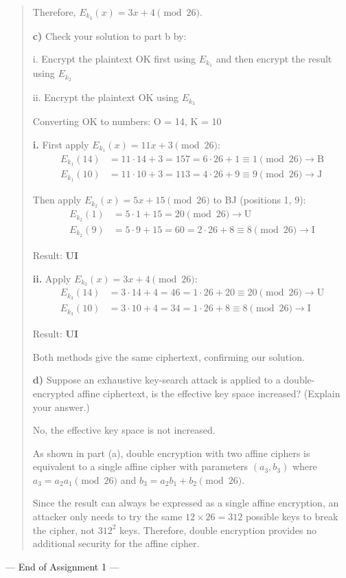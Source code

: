 \documentclass[12pt]{article}
\begin{document}
\begin{quote}
Therefore, $E_{k_3}(x) = 3x + 4 \pmod{26}$.

\vspace{0.5cm}

\textbf{c)} Check your solution to part b by:

i. Encrypt the plaintext OK first using $E_{k_1}$ and then encrypt the result using $E_{k_2}$

ii. Encrypt the plaintext OK using $E_{k_3}$

\vspace{0.3cm}

Converting OK to numbers: O = 14, K = 10

\textbf{i.} First apply $E_{k_1}(x) = 11x + 3 \pmod{26}$:
\begin{align*}
E_{k_1}(14) &= 11 \cdot 14 + 3 = 157 = 6 \cdot 26 + 1 \equiv 1 \pmod{26} \rightarrow \text{B}\\
E_{k_1}(10) &= 11 \cdot 10 + 3 = 113 = 4 \cdot 26 + 9 \equiv 9 \pmod{26} \rightarrow \text{J}
\end{align*}

Then apply $E_{k_2}(x) = 5x + 15 \pmod{26}$ to BJ (positions 1, 9):
\begin{align*}
E_{k_2}(1) &= 5 \cdot 1 + 15 = 20 \pmod{26} \rightarrow \text{U}\\
E_{k_2}(9) &= 5 \cdot 9 + 15 = 60 = 2 \cdot 26 + 8 \equiv 8 \pmod{26} \rightarrow \text{I}
\end{align*}

Result: \textbf{UI}

\textbf{ii.} Apply $E_{k_3}(x) = 3x + 4 \pmod{26}$:
\begin{align*}
E_{k_3}(14) &= 3 \cdot 14 + 4 = 46 = 1 \cdot 26 + 20 \equiv 20 \pmod{26} \rightarrow \text{U}\\
E_{k_3}(10) &= 3 \cdot 10 + 4 = 34 = 1 \cdot 26 + 8 \equiv 8 \pmod{26} \rightarrow \text{I}
\end{align*}

Result: \textbf{UI}

Both methods give the same ciphertext, confirming our solution.

\vspace{0.5cm}

\textbf{d)} Suppose an exhaustive key-search attack is applied to a double-encrypted affine ciphertext, is the effective key space increased? (Explain your answer.)

\vspace{0.3cm}

No, the effective key space is not increased.

As shown in part (a), double encryption with two affine ciphers is equivalent to a single affine cipher with parameters $(a_3, b_3)$ where $a_3 = a_2a_1 \pmod{26}$ and $b_3 = a_2b_1 + b_2 \pmod{26}$.

Since the result can always be expressed as a single affine encryption, an attacker only needs to try the same $12 \times 26 = 312$ possible keys to break the cipher, not $312^2$ keys. Therefore, double encryption provides no additional security for the affine cipher.

\end{quote}


\vspace{1cm}
\begin{center}
--- End of Assignment 1 ---
\end{center}
\end{document}

